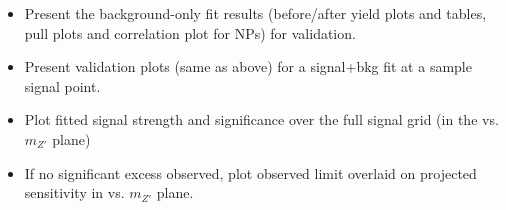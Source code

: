 \label{chapter:results}

\begin{itemize}
\item Present the background-only fit results (before/after yield plots and tables, pull plots and correlation plot for NPs) for validation.
\item Present validation plots (same as above) for a signal+bkg fit at a sample signal point.
\item Plot fitted signal strength and significance over the full signal grid (in the \ms vs. $m_{Z'}$ plane)
\item If no significant excess observed, plot observed limit overlaid on projected sensitivity in \ms vs. $m_{Z'}$ plane.
\end{itemize}